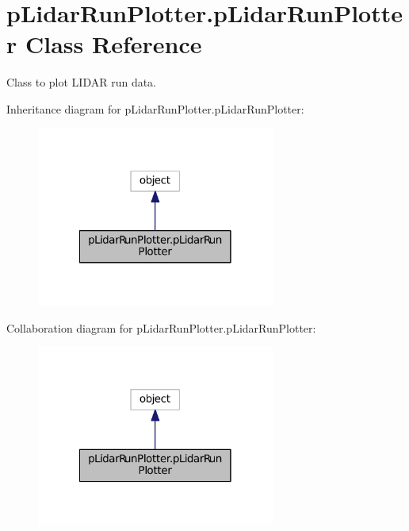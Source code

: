 \hypertarget{classpLidarRunPlotter_1_1pLidarRunPlotter}{\section{p\-Lidar\-Run\-Plotter.\-p\-Lidar\-Run\-Plotter Class Reference}
\label{classpLidarRunPlotter_1_1pLidarRunPlotter}
}


Class to plot L\-I\-D\-A\-R run data.  




Inheritance diagram for p\-Lidar\-Run\-Plotter.\-p\-Lidar\-Run\-Plotter\-:\nopagebreak
\begin{figure}[H]
\begin{center}
\leavevmode
\includegraphics[width=222pt]{classpLidarRunPlotter_1_1pLidarRunPlotter__inherit__graph}
\end{center}
\end{figure}


Collaboration diagram for p\-Lidar\-Run\-Plotter.\-p\-Lidar\-Run\-Plotter\-:\nopagebreak
\begin{figure}[H]
\begin{center}
\leavevmode
\includegraphics[width=222pt]{classpLidarRunPlotter_1_1pLidarRunPlotter__coll__graph}
\end{center}
\end{figure}
